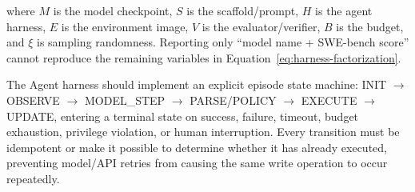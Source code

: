 \documentclass[10pt,a4paper,UTF8,fontset=none]{ctexart}
\newcommand{\ident}[1]{{\rmfamily #1}}
\begin{document}
where $M$ is the model checkpoint, $S$ is the scaffold/prompt, $H$ is the agent harness, $E$ is the environment image, $V$ is the evaluator/verifier, $B$ is the budget, and $\xi$ is sampling randomness. Reporting only ``model name + SWE-bench score'' cannot reproduce the remaining variables in Equation~\eqref{eq:harness-factorization}.

The Agent harness should implement an explicit episode state machine: \ident{INIT} $\rightarrow$ \ident{OBSERVE} $\rightarrow$ \ident{MODEL\_STEP} $\rightarrow$ \ident{PARSE/POLICY} $\rightarrow$ \ident{EXECUTE} $\rightarrow$ \ident{UPDATE}, entering a terminal state on success, failure, timeout, budget exhaustion, privilege violation, or human interruption. Every transition must be idempotent or make it possible to determine whether it has already executed, preventing model/API retries from causing the same write operation to occur repeatedly.
\end{document}
